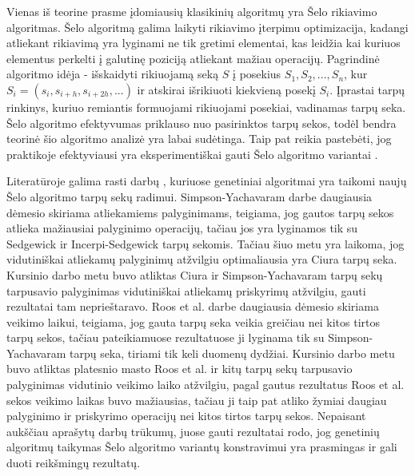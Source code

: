 \documentclass{VUMIFInfBakalaurinis}
\begin{document}
Vienas iš teorine prasme įdomiausių klasikinių algoritmų yra Šelo rikiavimo algoritmas.
Šelo algoritmą galima laikyti rikiavimo įterpimu optimizacija, kadangi atliekant rikiavimą yra lyginami ne tik gretimi elementai,
kas leidžia kai kuriuos elementus perkelti į galutinę poziciją atliekant mažiau operacijų.
Pagrindinė algoritmo idėja - išskaidyti rikiuojamą seką $S$ į posekius $S_1, S_2, ..., S_n$, kur
$S_i = (s_i, s_{i+h}, s_{i+2h}, ...)$ ir atskirai išrikiuoti kiekvieną posekį $S_i$.
Įprastai tarpų rinkinys, kuriuo remiantis formuojami rikiuojami posekiai, vadinamas tarpų seka.
Šelo algoritmo efektyvumas priklauso nuo pasirinktos tarpų sekos, todėl bendra teorinė šio algoritmo analizė yra labai sudėtinga.
Taip pat reikia pastebėti, jog praktikoje efektyviausi yra eksperimentiškai gauti Šelo algoritmo variantai \cite{ciura2001best,tokuda1992}.

Literatūroje galima rasti darbų \cite{roos2002genetic,simpson1999faster}, kuriuose genetiniai algoritmai yra taikomi naujų Šelo algoritmo tarpų sekų radimui.
Simpson-Yachavaram darbe daugiausia dėmesio skiriama atliekamiems palyginimams, teigiama, jog gautos tarpų sekos atlieka mažiausiai palyginimo operacijų,
tačiau jos yra lyginamos tik su Sedgewick ir Incerpi-Sedgewick tarpų sekomis.
Tačiau šiuo metu yra laikoma, jog vidutiniškai atliekamų palyginimų atžvilgiu optimaliausia yra Ciura \cite{ciura2001best} tarpų seka.
Kursinio darbo metu buvo atliktas Ciura ir Simpson-Yachavaram tarpų sekų tarpusavio palyginimas vidutiniškai atliekamų priskyrimų atžvilgiu, gauti rezultatai tam neprieštaravo.
Roos et al. darbe daugiausia dėmesio skiriama veikimo laikui, teigiama, jog gauta tarpų seka veikia greičiau nei kitos tirtos tarpų sekos, tačiau
pateikiamuose rezultatuose ji lyginama tik su Simpson-Yachavaram tarpų seka, tiriami tik keli duomenų dydžiai.
Kursinio darbo metu buvo atliktas platesnio masto Roos et al. ir kitų tarpų sekų tarpusavio palyginimas vidutinio veikimo laiko atžvilgiu,
pagal gautus rezultatus Roos et al. sekos veikimo laikas buvo mažiausias, tačiau ji taip pat atliko žymiai daugiau palyginimo ir priskyrimo operacijų nei kitos tirtos tarpų sekos.
Nepaisant aukščiau aprašytų darbų trūkumų, juose gauti rezultatai rodo, jog genetinių algoritmų taikymas Šelo algoritmo variantų konstravimui
yra prasmingas ir gali duoti reikšmingų rezultatų.
\end{document}
